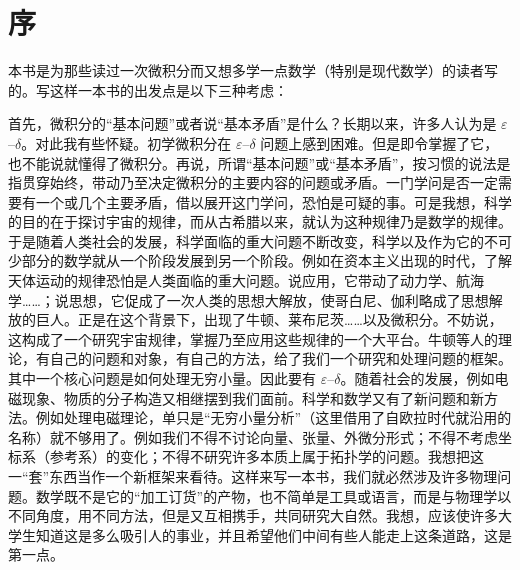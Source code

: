 \chapter*{序}

本书是为那些读过一次微积分而又想多学一点数学（特别是现代数学）的读者写的。写这样一本书的出发点是以下三种考虑：

首先，微积分的“基本问题”或者说“基本矛盾”是什么？长期以来，许多人认为是 $\varepsilon$--$\delta$。对此我有些怀疑。初学微积分在 $\varepsilon$--$\delta$ 问题上感到困难。但是即令掌握了它，也不能说就懂得了微积分。再说，所谓“基本问题”或“基本矛盾”，按习惯的说法是指贯穿始终，带动乃至决定微积分的主要内容的问题或矛盾。一门学问是否一定需要有一个或几个主要矛盾，借以展开这门学问，恐怕是可疑的事。可是我想，科学的目的在于探讨宇宙的规律，而从古希腊以来，就认为这种规律乃是数学的规律。于是随着人类社会的发展，科学面临的重大问题不断改变，科学以及作为它的不可少部分的数学就从一个阶段发展到另一个阶段。例如在资本主义出现的时代，了解天体运动的规律恐怕是人类面临的重大问题。说应用，它带动了动力学、航海学……；说思想，它促成了一次人类的思想大解放，使哥白尼、伽利略成了思想解放的巨人。正是在这个背景下，出现了牛顿、莱布尼茨……以及微积分。不妨说，这构成了一个研究宇宙规律，掌握乃至应用这些规律的一个大平台。牛顿等人的理论，有自己的问题和对象，有自己的方法，给了我们一个研究和处理问题的框架。其中一个核心问题是如何处理无穷小量。因此要有 $\varepsilon$--$\delta$。随着社会的发展，例如电磁现象、物质的分子构造又相继摆到我们面前。科学和数学又有了新问题和新方法。例如处理电磁理论，单只是“无穷小量分析”（这里借用了自欧拉时代就沿用的名称）就不够用了。例如我们不得不讨论向量、张量、外微分形式；不得不考虑坐标系（参考系）的变化；不得不研究许多本质上属于拓扑学的问题。我想把这一“套”东西当作一个新框架来看待。这样来写一本书，我们就必然涉及许多物理问题。数学既不是它的“加工订货”的产物，也不简单是工具或语言，而是与物理学以不同角度，用不同方法，但是又互相携手，共同研究大自然。我想，应该使许多大学生知道这是多么吸引人的事业，并且希望他们中间有些人能走上这条道路，这是第一点。

